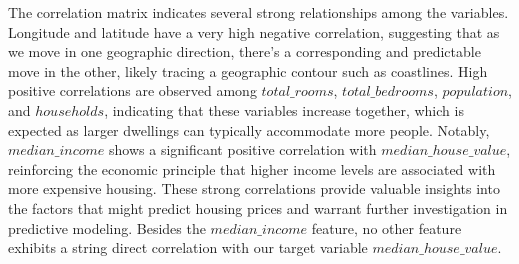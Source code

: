 \documentclass[12pt]{article}
\begin{document}
The correlation matrix indicates several strong relationships among the variables. Longitude and latitude have a very high negative correlation, suggesting that as we move in one geographic direction, there’s a corresponding and predictable move in the other, likely tracing a geographic contour such as coastlines. High positive correlations are observed among $total\_rooms$, $total\_bedrooms$, $population$, and $households$, indicating that these variables increase together, which is expected as larger dwellings can typically accommodate more people.
Notably, $median\_income$ shows a significant positive correlation with $median\_house\_value$, reinforcing the economic principle that higher income levels are associated with more expensive housing. These strong correlations provide valuable insights into the factors that might predict housing prices and warrant further investigation in predictive modeling.
Besides the $median\_income$ feature, no other feature exhibits a string direct correlation with our target variable $median\_house\_value$.
\end{document}
